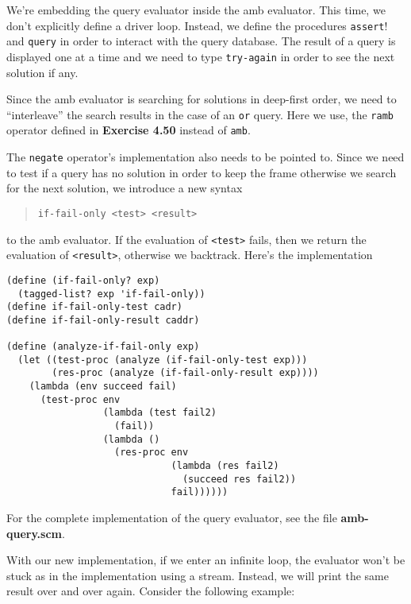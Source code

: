 \documentclass[a4paper,12pt]{article}
\begin{document}
We're embedding the query evaluator inside the amb evaluator.  This
time, we don't explicitly define a driver loop.  Instead, we define
the procedures \lstinline!assert!! and \lstinline!query! in order to
interact with the query database.  The result of a query is displayed
one at a time and we need to type \lstinline!try-again! in order to
see the next solution if any.

Since the amb evaluator is searching for solutions in deep-first
order, we need to ``interleave'' the search results in the case of an
\lstinline!or! query.  Here we use, the \lstinline!ramb! operator
defined in \textbf{Exercise 4.50} instead of \lstinline!amb!.

The \lstinline!negate! operator's implementation also needs to be
pointed to.  Since we need to test if a query has no solution in order
to keep the frame otherwise we search for the next solution, we
introduce a new syntax
\begin{quote}
  \lstinline!if-fail-only <test> <result>!
\end{quote}

to the amb evaluator.  If the evaluation of \lstinline!<test>! fails, then we
return the evaluation of \lstinline!<result>!, otherwise we backtrack.
Here's the implementation

\begin{lstlisting}
(define (if-fail-only? exp)
  (tagged-list? exp 'if-fail-only))
(define if-fail-only-test cadr)
(define if-fail-only-result caddr)

(define (analyze-if-fail-only exp)
  (let ((test-proc (analyze (if-fail-only-test exp)))
        (res-proc (analyze (if-fail-only-result exp))))
    (lambda (env succeed fail)
      (test-proc env
                 (lambda (test fail2)
                   (fail))
                 (lambda ()
                   (res-proc env
                             (lambda (res fail2)
                               (succeed res fail2))
                             fail))))))
\end{lstlisting}

For the complete implementation of the query evaluator, see the file
\textbf{amb-query.scm}.

With our new implementation, if we enter an infinite loop, the
evaluator won't be stuck as in the implementation using a stream.
Instead, we will print the same result over and over again.  Consider
the following example:
\end{document}
